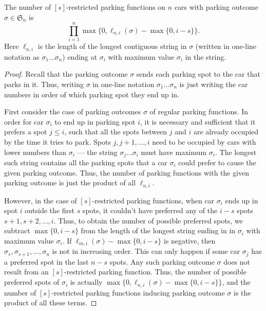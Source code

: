 \documentclass[12pt]{article}
\begin{document}
\begin{theorem}
    The number of $[s]$-restricted parking functions on $n$ cars with parking outcome $\sigma \in \mathfrak{S}_n$ is
    \[
    \prod_{i = 1}^n \max \{ 0, \ell_{n,i}(\sigma)-\max \{ 0, i - s \} \}.
    \]
    Here $\ell_{n, i}$ is the length of the longest contiguous string in $\sigma$ (written in one-line notation as $\sigma_{1} \dots \sigma_{n}$) ending at $\sigma_i$ with maximum value $\sigma_i$ in the string.
\end{theorem}

\begin{proof}
	Recall that the parking outcome $\sigma$ sends each parking spot to the car that parks in it. Thus, writing $\sigma$ in one-line notation $\sigma_{1} \dots \sigma_{n}$ is just writing the car numbers in order of which parking spot they end up in.

	First consider the case of parking outcomes $\sigma$ of regular parking functions. In order for car $\sigma_{i}$ to end up in parking spot $i$, it is necessary and sufficient that it prefers a spot $j \le i$, such that all the spots between $j$ and $i$ are already occupied by the time it tries to park. Spots $j, j + 1, \dots, i$ need to be occupied by cars with lower numbers than $\sigma_{i}$ --- the string $\sigma_{j} \dots \sigma_{i}$ must have maximum $\sigma_{i}$. The longest such string contains all the parking spots that a car $\sigma_{i}$ could prefer to cause the given parking outcome. Thus, the number of parking functions with the given parking outcome is just the product of all $\ell_{n, i}$.

	However, in the case of $[s]$-restricted parking functions, when car $\sigma_{i}$ ends up in spot $i$ outside the first $s$ spots, it couldn't have preferred any of the $i - s$ spots $s + 1, s + 2, \dots, i$. Thus, to obtain the number of possible preferred spots, we subtract $\max \{ 0, i - s \}$ from the length of the longest string ending in in $\sigma_{i}$ with maximum value $\sigma_{i}$. If $\ell_{m, i}(\sigma) - \max \{ 0, i - s \}$ is negative, then $\sigma_{s}, \sigma_{s + 1}, \dots, \sigma_{n}$ is not in increasing order. This can only happen if some car $\sigma_{j}$ has a preferred spot in the last $n - s$ spots. Any such parking outcome $\sigma$ does not result from an $[s]$-restricted parking function. Thus, the number of possible preferred spots of $\sigma_{i}$ is actually $\max \{ 0, \ell_{n, i}(\sigma) - \max \{ 0, i - s \} \}$, and the number of $[s]$-restricted parking functions inducing parking outcome $\sigma$ is the product of all these terms.
\end{proof}
 
\end{document}

